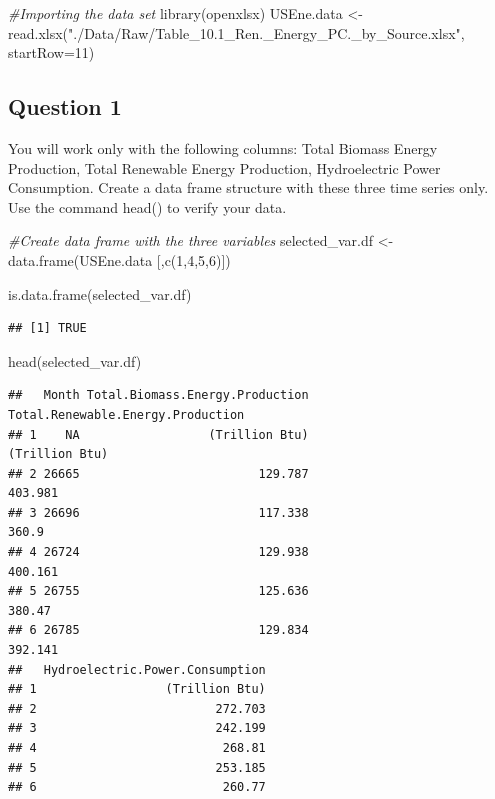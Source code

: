\documentclass[
]{article}
\newenvironment{Shaded}{\begin{snugshade}}{\end{snugshade}}
\newcommand{\AttributeTok}[1]{\textcolor[rgb]{0.77,0.63,0.00}{#1}}
\newcommand{\CommentTok}[1]{\textcolor[rgb]{0.56,0.35,0.01}{\textit{#1}}}
\newcommand{\DecValTok}[1]{\textcolor[rgb]{0.00,0.00,0.81}{#1}}
\newcommand{\FunctionTok}[1]{\textcolor[rgb]{0.00,0.00,0.00}{#1}}
\newcommand{\NormalTok}[1]{#1}
\newcommand{\OtherTok}[1]{\textcolor[rgb]{0.56,0.35,0.01}{#1}}
\newcommand{\StringTok}[1]{\textcolor[rgb]{0.31,0.60,0.02}{#1}}
\begin{document}
\begin{Shaded}
\begin{Highlighting}[]
\CommentTok{\#Importing the data set}
\FunctionTok{library}\NormalTok{(openxlsx)}
\NormalTok{USEne.data }\OtherTok{\textless{}{-}} \FunctionTok{read.xlsx}\NormalTok{(}\StringTok{"./Data/Raw/Table\_10.1\_Ren.\_Energy\_PC.\_by\_Source.xlsx"}\NormalTok{, }\AttributeTok{startRow=}\DecValTok{11}\NormalTok{)}
\end{Highlighting}
\end{Shaded}

\hypertarget{question-1}{%
\subsection{Question 1}\label{question-1}}

You will work only with the following columns: Total Biomass Energy
Production, Total Renewable Energy Production, Hydroelectric Power
Consumption. Create a data frame structure with these three time series
only. Use the command head() to verify your data.

\begin{Shaded}
\begin{Highlighting}[]
\CommentTok{\#Create data frame with the three variables}
\NormalTok{selected\_var.df }\OtherTok{\textless{}{-}} \FunctionTok{data.frame}\NormalTok{(USEne.data [,}\FunctionTok{c}\NormalTok{(}\DecValTok{1}\NormalTok{,}\DecValTok{4}\NormalTok{,}\DecValTok{5}\NormalTok{,}\DecValTok{6}\NormalTok{)])}

\FunctionTok{is.data.frame}\NormalTok{(selected\_var.df)}
\end{Highlighting}
\end{Shaded}

\begin{verbatim}
## [1] TRUE
\end{verbatim}

\begin{Shaded}
\begin{Highlighting}[]
\FunctionTok{head}\NormalTok{(selected\_var.df)}
\end{Highlighting}
\end{Shaded}

\begin{verbatim}
##   Month Total.Biomass.Energy.Production Total.Renewable.Energy.Production
## 1    NA                  (Trillion Btu)                    (Trillion Btu)
## 2 26665                         129.787                           403.981
## 3 26696                         117.338                             360.9
## 4 26724                         129.938                           400.161
## 5 26755                         125.636                            380.47
## 6 26785                         129.834                           392.141
##   Hydroelectric.Power.Consumption
## 1                  (Trillion Btu)
## 2                         272.703
## 3                         242.199
## 4                          268.81
## 5                         253.185
## 6                          260.77
\end{verbatim}
\end{document}
